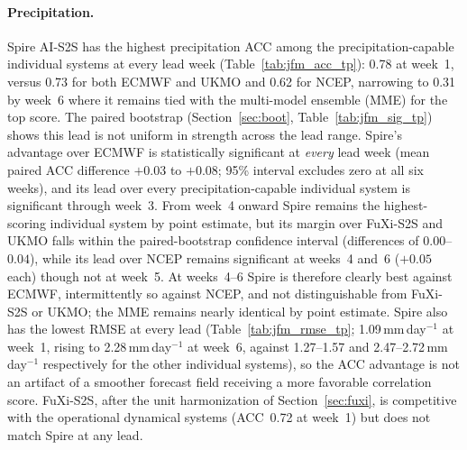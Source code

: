 \documentclass[11pt,a4paper]{article}
\begin{document}
\paragraph{Precipitation.}
Spire AI-S2S has the highest precipitation ACC among the precipitation-capable
individual systems at every lead week (Table~\ref{tab:jfm_acc_tp}): 0.78 at week~1, versus 0.73 for both
ECMWF and UKMO and 0.62 for NCEP, narrowing to 0.31 by week~6 where it remains
tied with the multi-model ensemble (MME) for the top score. The paired bootstrap
(Section~\ref{sec:boot}, Table~\ref{tab:jfm_sig_tp}) shows this lead is not
uniform in strength across the lead range. Spire's advantage over ECMWF is
statistically significant at \emph{every} lead week (mean paired ACC difference
$+0.03$ to $+0.08$; 95\% interval excludes zero at all six weeks), and its lead
over every precipitation-capable individual system is significant through
week~3. From week~4 onward Spire remains the highest-scoring individual system
by point estimate, but its margin over FuXi-S2S and UKMO falls within the paired-bootstrap confidence
interval (differences of $0.00$--$0.04$), while its lead over NCEP remains
significant at weeks~4 and~6 ($+0.05$ each) though not at week~5. At weeks~4--6
Spire is therefore clearly best against ECMWF, intermittently so against NCEP,
and not distinguishable from FuXi-S2S or UKMO; the MME remains nearly identical
by point estimate. Spire also has the lowest RMSE at every lead
(Table~\ref{tab:jfm_rmse_tp}; 1.09\,mm\,day$^{-1}$ at week~1, rising to
2.28\,mm\,day$^{-1}$ at week~6, against 1.27--1.57 and
2.47--2.72\,mm\,day$^{-1}$ respectively for the other individual systems), so
the ACC advantage is not an artifact of a smoother forecast field receiving a
more favorable correlation score. FuXi-S2S, after the unit harmonization of
Section~\ref{sec:fuxi}, is competitive with the operational dynamical systems
(ACC~0.72 at week~1) but does not match Spire at any lead.
\end{document}
